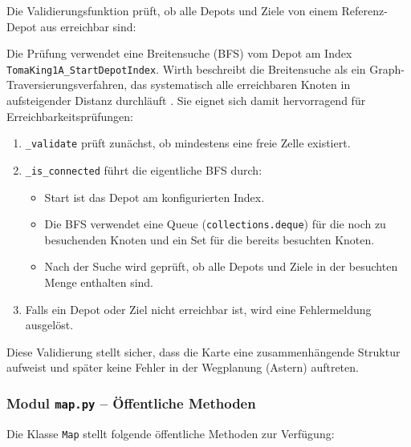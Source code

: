 Die Validierungsfunktion prüft, ob alle Depots und Ziele von einem Referenz-Depot aus erreichbar sind:



Die Prüfung verwendet eine Breitensuche (\acs{BFS}) vom Depot am Index \\
\texttt{TomaKing1A\_StartDepotIndex}. Wirth beschreibt die Breitensuche als ein Graph-Traversierungsverfahren, das systematisch alle erreichbaren Knoten in aufsteigender Distanz durchläuft \cite[S. 70\,f.]{4}. Sie eignet sich damit hervorragend für Erreichbarkeitsprüfungen:

\begin{enumerate}
    \item \texttt{\_validate} prüft zunächst, ob mindestens eine freie Zelle existiert.
    \item \texttt{\_is\_connected} führt die eigentliche \acs{BFS} durch:
    \begin{itemize}
        \item Start ist das Depot am konfigurierten Index.
        \item Die \acs{BFS} verwendet eine Queue (\texttt{collections.deque}) für die
              noch zu besuchenden Knoten und ein Set für die bereits besuchten
              Knoten.
        \item Nach der Suche wird geprüft, ob alle Depots und Ziele in der
              besuchten Menge enthalten sind.
    \end{itemize}
    \item Falls ein Depot oder Ziel nicht erreichbar ist, wird eine Fehlermeldung
          ausgelöst.
\end{enumerate}

Diese Validierung stellt sicher, dass die Karte eine zusammenhängende Struktur aufweist und später keine Fehler in der Wegplanung (\acs{Astern}) auftreten.


\subsubsection{Modul \texttt{map.py} – Öffentliche Methoden}

Die Klasse \texttt{Map} stellt folgende öffentliche Methoden zur Verfügung:

